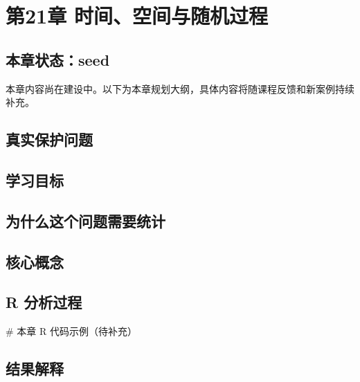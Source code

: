 \documentclass[
  letterpaper,
]{scrbook}
\newenvironment{Shaded}{\begin{snugshade}}{\end{snugshade}}
\newcommand{\CommentTok}[1]{\textcolor[rgb]{0.37,0.37,0.37}{#1}}
\begin{document}
\chapter{第21章
时间、空间与随机过程}\label{ux7b2c21ux7ae0-ux65f6ux95f4ux7a7aux95f4ux4e0eux968fux673aux8fc7ux7a0b-1}

\section{本章状态：seed}\label{ux672cux7ae0ux72b6ux6001seed-10}

本章内容尚在建设中。以下为本章规划大纲，具体内容将随课程反馈和新案例持续补充。

\section{真实保护问题}\label{ux771fux5b9eux4fddux62a4ux95eeux9898-17}

\section{学习目标}\label{ux5b66ux4e60ux76eeux6807-13}

\section{为什么这个问题需要统计}\label{ux4e3aux4ec0ux4e48ux8fd9ux4e2aux95eeux9898ux9700ux8981ux7edfux8ba1-10}

\section{核心概念}\label{ux6838ux5fc3ux6982ux5ff5-10}

\section{R 分析过程}\label{r-ux5206ux6790ux8fc7ux7a0b-12}

\begin{Shaded}
\begin{Highlighting}[]
\CommentTok{\# 本章 R 代码示例（待补充）}
\end{Highlighting}
\end{Shaded}

\section{结果解释}\label{ux7ed3ux679cux89e3ux91ca-10}
\end{document}
